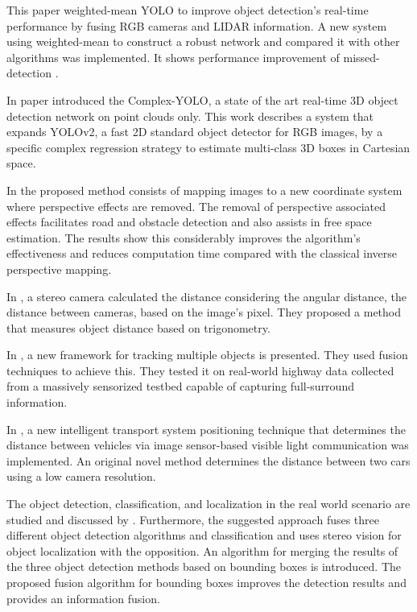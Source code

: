 This paper weighted-mean YOLO to improve object detection's real-time performance by fusing RGB cameras and LIDAR information. A new system using weighted-mean to construct a robust network and compared it with other algorithms was implemented. It shows performance improvement of missed-detection \cite{Kim2019}.

In paper \cite{Simon2019} introduced the Complex-YOLO, a state of the art real-time 3D object detection network on point clouds only. This work describes a system that expands YOLOv2, a fast 2D standard object detector for RGB images, by a specific complex regression strategy to estimate multi-class 3D boxes in Cartesian space. 

In \cite{Oliveira2015} the proposed method consists of mapping images to a new coordinate system where perspective effects are removed. The removal of perspective associated effects facilitates road and obstacle detection and also assists in free space estimation. The results show this considerably improves the algorithm's effectiveness and reduces computation time compared with the classical inverse perspective mapping.

In \cite{Salman2017}, a stereo camera calculated the distance considering the angular distance, the distance between cameras, based on the image's pixel. They proposed a method that measures object distance based on trigonometry.   

 In \cite{Rangesh2019}, a new framework for tracking multiple objects is presented. They used fusion techniques to achieve this. They tested it on real-world highway data collected from a massively sensorized testbed capable of capturing full-surround information.

In \cite{Tram2018}, a new intelligent transport system positioning technique that determines the distance between vehicles via image sensor-based visible light communication was implemented. An original novel method determines the distance between two cars using a low camera resolution.

The object detection, classification, and localization in the real world scenario are studied and discussed by \cite{Hofmann2019}. Furthermore, the suggested approach fuses three different object detection algorithms and classification and uses stereo vision for object localization with the opposition. An algorithm for merging the results of the three object detection methods based on bounding boxes is introduced. The proposed fusion algorithm for bounding boxes improves the detection results and provides an information fusion.







